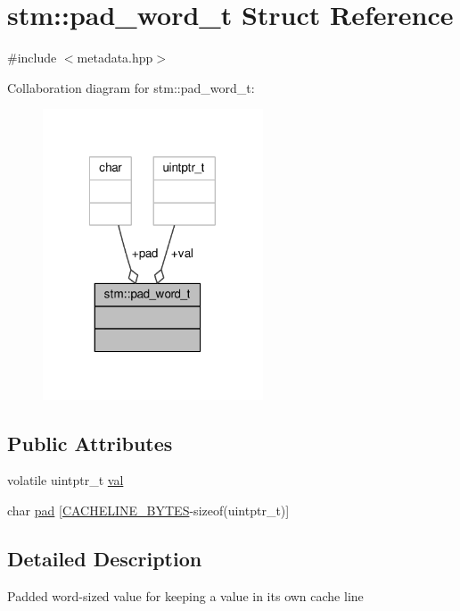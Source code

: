 \hypertarget{structstm_1_1pad__word__t}{\section{stm\-:\-:pad\-\_\-word\-\_\-t Struct Reference}
\label{structstm_1_1pad__word__t}
}


{\ttfamily \#include $<$metadata.\-hpp$>$}



Collaboration diagram for stm\-:\-:pad\-\_\-word\-\_\-t\-:
\nopagebreak
\begin{figure}[H]
\begin{center}
\leavevmode
\includegraphics[width=185pt]{structstm_1_1pad__word__t__coll__graph}
\end{center}
\end{figure}
\subsection*{Public Attributes}
\begin{DoxyCompactItemize}
\item 
volatile uintptr\-\_\-t \hyperlink{structstm_1_1pad__word__t_adb34896d04147daf2aa7c67fc82a5247}{val}
\item 
char \hyperlink{structstm_1_1pad__word__t_a7dc4408789052163966860e1312bea81}{pad} \mbox{[}\hyperlink{platform_8hpp_a4538b5ec4a295a2b8a52560e61575041}{C\-A\-C\-H\-E\-L\-I\-N\-E\-\_\-\-B\-Y\-T\-E\-S}-\/sizeof(uintptr\-\_\-t)\mbox{]}
\end{DoxyCompactItemize}


\subsection{Detailed Description}
Padded word-\/sized value for keeping a value in its own cache line 

